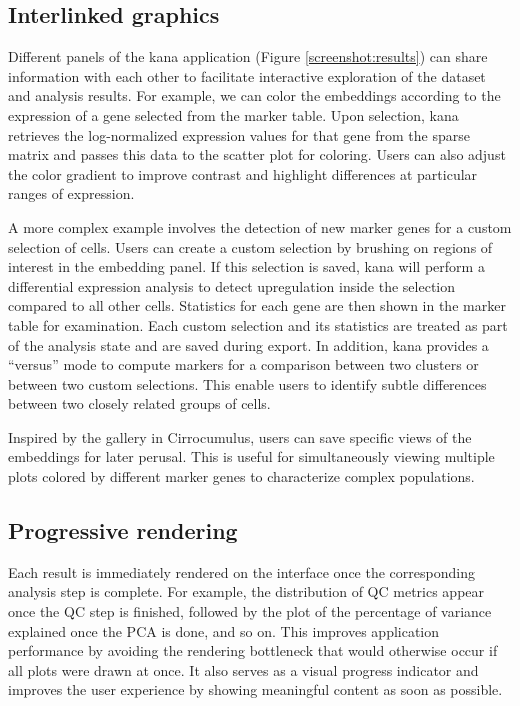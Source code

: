 \documentclass{article}
\begin{document}
\subsection{Interlinked graphics}

Different panels of the kana application (Figure \ref{screenshot:results}) can share information with each other to facilitate interactive exploration of the dataset and analysis results.
For example, we can color the embeddings according to the expression of a gene selected from the marker table.
Upon selection, kana retrieves the log-normalized expression values for that gene from the sparse matrix and passes this data to the scatter plot for coloring.
Users can also adjust the color gradient to improve contrast and highlight differences at particular ranges of expression.

A more complex example involves the detection of new marker genes for a custom selection of cells.
Users can create a custom selection by brushing on regions of interest in the embedding panel.
If this selection is saved, kana will perform a differential expression analysis to detect upregulation inside the selection compared to all other cells.
Statistics for each gene are then shown in the marker table for examination.
Each custom selection and its statistics are treated as part of the analysis state and are saved during export. 
In addition, kana provides a ``versus'' mode to compute markers for a comparison between two clusters or between two custom selections.
This enable users to identify subtle differences between two closely related groups of cells.

Inspired by the gallery in Cirrocumulus, users can save specific views of the embeddings for later perusal.
This is useful for simultaneously viewing multiple plots colored by different marker genes to characterize complex populations.

\subsection{Progressive rendering}

Each result is immediately rendered on the interface once the corresponding analysis step is complete.
For example, the distribution of QC metrics appear once the QC step is finished, followed by the plot of the percentage of variance explained once the PCA is done, and so on.
This improves application performance by avoiding the rendering bottleneck that would otherwise occur if all plots were drawn at once. 
It also serves as a visual progress indicator and improves the user experience by showing meaningful content as soon as possible.
\end{document}
